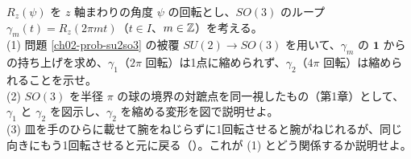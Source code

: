 \begin{problem}[難易度 B]\label{ch02-prob-belt}
$R_z(\psi)$ を $z$ 軸まわりの角度 $\psi$ の回転とし、$SO(3)$ のループ $\gamma_m(t)=R_z(2\pi mt)$（$t\in I$、$m\in\mathbb{Z}$）を考える。\\
(1) 問題 \ref{ch02-prob-su2so3} の被覆 $SU(2)\to SO(3)$ を用いて、$\gamma_m$ の $\mathbf 1$ からの持ち上げを求め、$\gamma_1$（$2\pi$ 回転）は1点に縮められず、$\gamma_2$（$4\pi$ 回転）は縮められることを示せ。\\
(2) $SO(3)$ を半径 $\pi$ の球の境界の対蹠点を同一視したもの（第1章）として、$\gamma_1$ と $\gamma_2$ を図示し、$\gamma_2$ を縮める変形を図で説明せよ。\\
(3) 皿を手のひらに載せて腕をねじらずに1回転させると腕がねじれるが、同じ向きにもう1回転させると元に戻る（）。これが (1) とどう関係するか説明せよ。
\end{problem}

